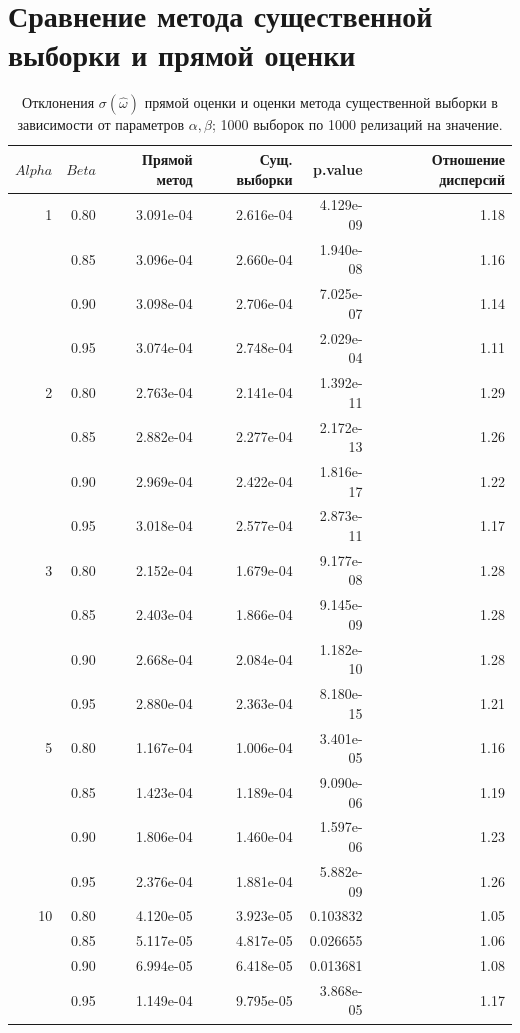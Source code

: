 \documentclass[12pt, specialist, subf, substylefile = spbu.rtx]{disser}
\begin{document}
\section{Сравнение метода существенной выборки и прямой оценки}
\nopagebreak[4]
\begin{table}[ht]
\caption{Отклонения $\sigma(\hat{\omega})$ прямой оценки и оценки метода существенной выборки в зависимости от параметров $\alpha, \beta$; 1000 выборок по 1000 релизаций на значение.} 
\label{table:cmp}
\centering
\begin{tabular}{rrrrrr}
  \hline
$Alpha$ & $Beta$ & Прямой метод & Сущ. выборки & p.value & Отношение дисперсий \\ 
  \hline
1 & 0.80 & 3.091e-04 & 2.616e-04 & 4.129e-09 & 1.18 \\ 
 & 0.85 & 3.096e-04 & 2.660e-04 & 1.940e-08 & 1.16 \\ 
 & 0.90 & 3.098e-04 & 2.706e-04 & 7.025e-07 & 1.14 \\ 
 & 0.95 & 3.074e-04 & 2.748e-04 & 2.029e-04 & 1.11 \\ 
   \hline
2 & 0.80 & 2.763e-04 & 2.141e-04 & 1.392e-11 & 1.29 \\ 
 & 0.85 & 2.882e-04 & 2.277e-04 & 2.172e-13 & 1.26 \\ 
 & 0.90 & 2.969e-04 & 2.422e-04 & 1.816e-17 & 1.22 \\ 
 & 0.95 & 3.018e-04 & 2.577e-04 & 2.873e-11 & 1.17 \\ 
   \hline
3 & 0.80 & 2.152e-04 & 1.679e-04 & 9.177e-08 & 1.28 \\ 
 & 0.85 & 2.403e-04 & 1.866e-04 & 9.145e-09 & 1.28 \\ 
 & 0.90 & 2.668e-04 & 2.084e-04 & 1.182e-10 & 1.28 \\ 
 & 0.95 & 2.880e-04 & 2.363e-04 & 8.180e-15 & 1.21 \\ 
   \hline
5 & 0.80 & 1.167e-04 & 1.006e-04 & 3.401e-05 & 1.16 \\ 
 & 0.85 & 1.423e-04 & 1.189e-04 & 9.090e-06 & 1.19 \\ 
 & 0.90 & 1.806e-04 & 1.460e-04 & 1.597e-06 & 1.23 \\ 
 & 0.95 & 2.376e-04 & 1.881e-04 & 5.882e-09 & 1.26 \\ 
   \hline  
10 &  0.80 & 4.120e-05 & 3.923e-05 & 0.103832 & 1.05 \\ 
 & 0.85 & 5.117e-05 & 4.817e-05 & 0.026655 & 1.06 \\ 
 & 0.90 & 6.994e-05 & 6.418e-05 & 0.013681 & 1.08 \\ 
 & 0.95 & 1.149e-04 & 9.795e-05 & 3.868e-05 & 1.17 \\ 
     \hline
\end{tabular}
\end{table}
\end{document}
